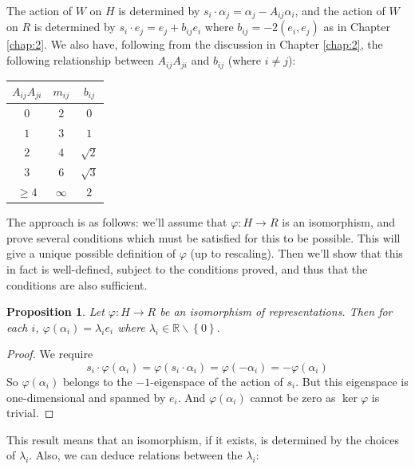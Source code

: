 \documentclass[11pt,a4paper]{report}
\newtheorem{proposition}[theorem]{Proposition}
\theoremstyle{definition}
\begin{document}
The action of $W$ on $H$ is determined by $s_i \cdot \alpha_j = \alpha_j - A_{ij} \alpha_i$, and the action of $W$ on $R$ is determined by $s_i \cdot e_j = e_j + b_{ij} e_i$ where $b_{ij} = -2(e_i, e_j)$ as in Chapter \ref{chap:2}. We also have, following from the discussion in Chapter \ref{chap:2}, the following relationship between $A_{ij} A_{ji}$ and $b_{ij}$ (where $i \neq j$): 

\begin{center}
\begin{tabular}{|c|c|c|}
 \hline
 $A_{ij} A_{ji}$ & $m_{ij}$ & $b_{ij}$\\
 \hline
 $0$ & $2$ & $0$\\
 \hline
 $1$ & $3$ & $1$\\
 \hline
 $2$ & $4$ & $\sqrt{2}$\\
 \hline
 $3$ & $6$ & $\sqrt{3}$\\
 \hline
 $\geq 4$ & $\infty$ & $2$\\
 \hline
\end{tabular}
\end{center}

The approach is as follows: we'll assume that $\varphi: H \to R$ is an isomorphism, and prove several conditions which must be satisfied for this to be possible. This will give a unique possible definition of $\varphi$ (up to rescaling). Then we'll show that this in fact is well-defined, subject to the conditions proved, and thus that the conditions are also sufficient.

\begin{proposition}\label{prop:isomorphscalar} Let $\varphi: H \to R$ be an isomorphism of representations. Then for each $i$, $\varphi(\alpha_i) = \lambda_i e_i$ where $\lambda_i \in \mathbb{R} \backslash \left\{0\right\}$.\end{proposition} 

\begin{proof} We require \begin{equation*}s_i \cdot \varphi(\alpha_i) = \varphi(s_i \cdot \alpha_i) = \varphi(- \alpha_i) = - \varphi(\alpha_i)\end{equation*} So $\varphi(\alpha_i)$ belongs to the $-1$-eigenspace of the action of $s_i$. But this eigenspace is one-dimensional and spanned by $e_i$. And $\varphi(\alpha_i)$ cannot be zero as $\ker \varphi$ is trivial. \end{proof}

This result means that an isomorphism, if it exists, is determined by the choices of $\lambda_i$. Also, we can deduce relations between the $\lambda_i$:
\end{document}
